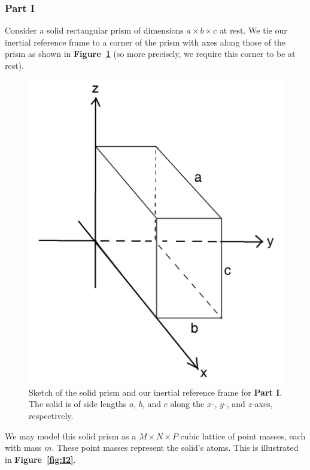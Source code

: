 \documentclass[letterpaper,12pt]{article}
\begin{document}
\begin{flushleft}
    \subsubsection*{Part I}
    Consider a solid rectangular prism of dimensions $a \times b \times c$ at rest. We tie our inertial reference frame to a corner of the prism with axes along those of the prism as shown in \textbf{Figure~\ref{fig:I1}} (so more precisely, we require this corner to be at rest).
    \begin{figure}[h]
        \centering
        \includegraphics[scale=0.8]{images/i1.jpg}
        \caption{Sketch of the solid prism and our inertial reference frame for \textbf{Part I}. The solid is of side lengths $a$, $b$, and $c$ along the $x$-, $y$-, and $z$-axes, respectively.}
        \label{fig:I1}
    \end{figure}
    We may model this solid prism as a $M \times N \times P$ cubic lattice of point masses, each with mass $m$. These point masses represent the solid's atoms. This is illustrated in \textbf{Figure~\ref{fig:I2}}.
    \begin{figure}[h]
        \centering

\end{figure}
\end{flushleft}
\end{document}
